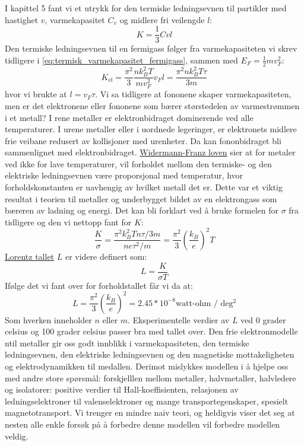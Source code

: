 \documentclass{article}
\begin{document}
I kapittel 5 fant vi et utrykk for den termiske ledningsevnen til partikler med hastighet $v$, varmekapasitet $C_v$ og midlere fri veilengde $l$:
\begin{equation}
    K = \frac{1}{3} Cvl
\end{equation}
Den termiske ledningsevnen til en fermigass følger fra varmekapasiteten vi skrev tidligere i \ref{eq:termisk_varmekapasitet_fermigass}, sammen med $E_F = \frac{1}{2} mv_F^2$:
\begin{equation}
    K_{\text{el}} = \frac{\pi^2}{3} \frac{n k_B^2 T}{m v_F^2} v_F l = \frac{\pi^2 n k_B^2 T \tau}{3m} 
\end{equation}
hvor vi brukte at $l = v_F \tau$. Vi sa tidligere at fononene skaper varmekapasiteten, men er det elektronene eller fononene som bærer størstedelen av varmestrømmen i et metall? I rene metaller er elektronbidraget dominerende ved alle temperaturer. I urene metaller eller i uordnede legeringer, er elektronets midlere frie veibane redusert av kollisjoner med urenheter. Da kan fononbidraget bli sammenlignet med elektronbidraget.
\underline{Widermann-Franz loven} sier at for metaler ved ikke for lave temperaturer, vil forholdet mellom den termiske- og den elektriske ledningsevnen være proporsjonal med temperatur, hvor forholdskonstanten er uavhengig av hvilket metall det er. Dette var et viktig resultat i teorien til metaller og underbygget bildet av en elektrongass som bæreren av ladning og energi. Det kan bli forklart ved å bruke formelen for $\sigma$ fra tidligere og den vi nettopp fant for $K$:
\begin{equation}
    \frac{K}{\sigma} = \frac{\pi^2 k_B^2 T n \tau / 3m}{n e \tau^2 / m} = \frac{\pi^2}{3} \left(\frac{k_B}{e}\right)^2 T
\end{equation}
\underline{Lorentz tallet} $L$ er videre definert som:
\begin{equation}
    L = \frac{K}{\sigma T}
\end{equation}
Ifølge det vi fant over for forholdstallet får vi da at:
\begin{equation}
    L = \frac{\pi^2}{3} \left(\frac{k_B}{e}\right)^2 = 2.45 * 10^{-8} \text{watt-ohm / deg$^2$}
\end{equation}
Som hverken inneholder $n$ eller $m$. Eksperimentelle verdier av $L$ ved 0 grader celsius og 100 grader celsius passer bra med tallet over.
\nyside
{}
Den frie elektronmodelle ntil metaller gir oss godt innblikk i varmekapasiteten, den termiske ledningsevnen, den elektriske ledningsevnen og den magnetiske mottakeligheten og elektrodynamikken til medallen. Derimot mislykkes modellen i å hjelpe oss med andre store spørsmål: forskjelllen mellom metaller, halvmetaller, halvledere og isolatorer: positive verdier til Hall-koeffisienten, relasjonen av ledningselektroner til valenselektroner og mange transportegenskaper, spesielt magnetotransport. Vi trenger en mindre naiv teori, og heldigvis viser det seg at nesten alle enkle forsøk på å forbedre denne modellen vil forbedre modellen veldig.
\end{document}
